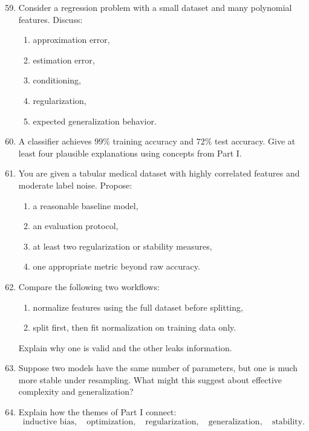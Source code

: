 \begin{enumerate}
\setcounter{enumi}{58}
    \item Consider a regression problem with a small dataset and many polynomial features.
    Discuss:
    \begin{enumerate}
        \item approximation error,
        \item estimation error,
        \item conditioning,
        \item regularization,
        \item expected generalization behavior.
    \end{enumerate}

    \item A classifier achieves $99\%$ training accuracy and $72\%$ test accuracy.
    Give at least four plausible explanations using concepts from Part I.

    \item You are given a tabular medical dataset with highly correlated features and moderate label noise.
    Propose:
    \begin{enumerate}
        \item a reasonable baseline model,
        \item an evaluation protocol,
        \item at least two regularization or stability measures,
        \item one appropriate metric beyond raw accuracy.
    \end{enumerate}

    \item Compare the following two workflows:
    \begin{enumerate}
        \item normalize features using the full dataset before splitting,
        \item split first, then fit normalization on training data only.
    \end{enumerate}
    Explain why one is valid and the other leaks information.

    \item Suppose two models have the same number of parameters, but one is much more stable under resampling.
    What might this suggest about effective complexity and generalization?

    \item Explain how the themes of Part I connect:
    \[
    \text{inductive bias},\quad \text{optimization},\quad \text{regularization},\quad \text{generalization},\quad \text{stability}.
    \]
\end{enumerate}